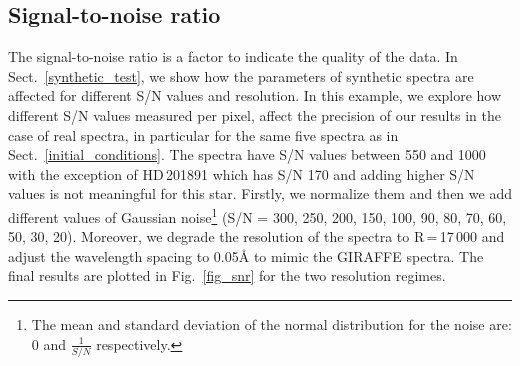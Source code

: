 \documentclass[fleqn,usenatbib]{mnras}
\begin{document}
\begin{table*}
\caption{Mean differences ($\Delta$), median differences (med), standard deviations ($\sigma$), and mean absolute deviation (MAD) for the 500 different initial values.}
\label{initial_table}
\hspace*{-3em}
\end{table*}

\subsection{Signal-to-noise ratio}

The signal-to-noise ratio is a factor to indicate the quality of the data. In Sect.~\ref{synthetic_test}, we show how the parameters of synthetic spectra 
are affected for different S/N values and resolution. In this example, we explore how different S/N values measured per pixel, affect the precision of our results in the case of real spectra, 
in particular for the same five spectra as in Sect.~\ref{initial_conditions}. The spectra have S/N values between 550 and 1000 with the exception of HD\,201891 which has S/N 170 and adding 
higher S/N values is not meaningful for this star. Firstly, we normalize them and then we add different values of Gaussian noise\footnote{The mean and standard deviation 
of the normal distribution for the noise are: 0 and $\tfrac{1}{S/N}$ respectively.} (S/N = 300, 250, 200, 150, 100, 90, 80, 70, 60, 50, 30, 20). Moreover, we degrade 
the resolution of the spectra to R\,=\,17\,000 and adjust the wavelength spacing to 0.05\AA{} to mimic the GIRAFFE spectra. The final results are plotted in Fig.~\ref{fig_snr} for the two 
resolution regimes. 
\end{document}
